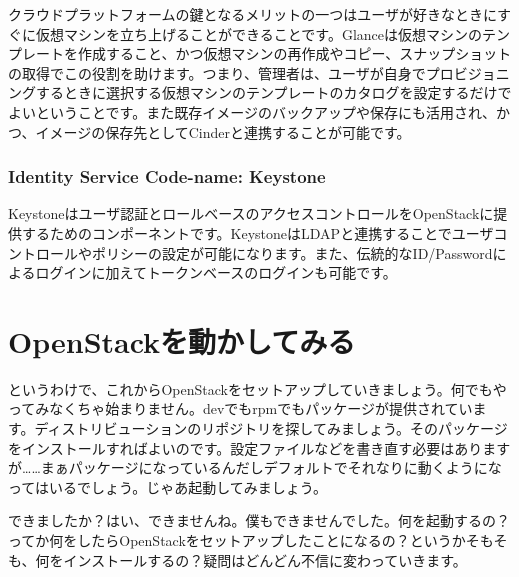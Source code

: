 \documentclass[9pt,b5paper,tombo,openany,dvipdfmx]{jsbook}
\begin{document}
クラウドプラットフォームの鍵となるメリットの一つはユーザが好きなときにすぐに仮想マシンを立ち上げることができることです。Glanceは仮想マシンのテンプレートを作成すること、かつ仮想マシンの再作成やコピー、スナップショットの取得でこの役割を助けます。つまり、管理者は、ユーザが自身でプロビジョニングするときに選択する仮想マシンのテンプレートのカタログを設定するだけでよいということです。また既存イメージのバックアップや保存にも活用され、かつ、イメージの保存先としてCinderと連携することが可能です。

\subsection{Identity Service Code-name: Keystone}

Keystoneはユーザ認証とロールベースのアクセスコントロールをOpenStackに提供するためのコンポーネントです。KeystoneはLDAPと連携することでユーザコントロールやポリシーの設定が可能になります。また、伝統的なID/Passwordによるログインに加えてトークンベースのログインも可能です。

\chapter{OpenStackを動かしてみる}

というわけで、これからOpenStackをセットアップしていきましょう。何でもやってみなくちゃ始まりません。devでもrpmでもパッケージが提供されています。ディストリビューションのリポジトリを探してみましょう。そのパッケージをインストールすればよいのです。設定ファイルなどを書き直す必要はありますが……まぁパッケージになっているんだしデフォルトでそれなりに動くようになってはいるでしょう。じゃあ起動してみましょう。

できましたか？はい、できませんね。僕もできませんでした。何を起動するの？ってか何をしたらOpenStackをセットアップしたことになるの？というかそもそも、何をインストールするの？疑問はどんどん不信に変わっていきます。
\end{document}
